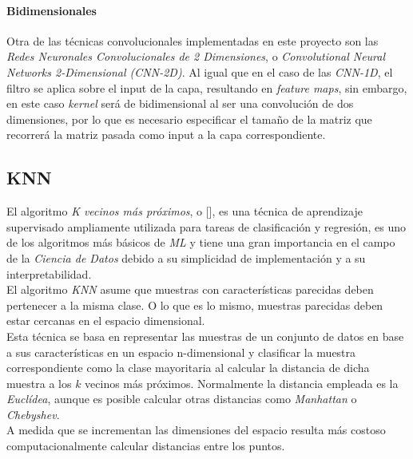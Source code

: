                     
                \paragraph{Bidimensionales}
                    Otra de las técnicas convolucionales implementadas en este proyecto son las \textit{Redes Neuronales Convolucionales de 2 Dimensiones}, o \textit{Convolutional Neural Networks 2-Dimensional (CNN-2D)}. Al igual que en el caso de las \textit{CNN-1D}, el filtro se aplica sobre el input de la capa, resultando en \textit{feature maps}, sin embargo, en este caso \textit{kernel} será de bidimensional al ser una convolución de dos dimensiones, por lo que es necesario especificar el tamaño de la matriz que recorrerá la matriz pasada como input a la capa correspondiente.

            \subsection {KNN}

                El algoritmo \textit{K vecinos más próximos}, o  [\cite{KNN}], es una técnica de aprendizaje supervisado ampliamente utilizada para tareas de clasificación y regresión, es uno de los algoritmos más básicos de \textit{ML} y tiene una gran importancia en el campo de la \textit{Ciencia de Datos} debido a su simplicidad de implementación y a su interpretabilidad.\\

                El algoritmo \textit{KNN} asume que muestras con características parecidas deben pertenecer a la misma clase. O lo que es lo mismo, muestras parecidas deben estar cercanas en el espacio dimensional.\\

                Esta técnica se basa en representar las muestras de un conjunto de datos en base a sus características en un espacio n-dimensional y clasificar la muestra correspondiente como la clase mayoritaria al calcular la distancia de dicha muestra a los $k$ vecinos más próximos. Normalmente la distancia empleada es la \textit{Euclídea}, aunque es posible calcular otras distancias como \textit{Manhattan} o \textit{Chebyshev}.\\
                
                A medida que se incrementan las dimensiones del espacio resulta más costoso computacionalmente calcular distancias entre los puntos.\\


